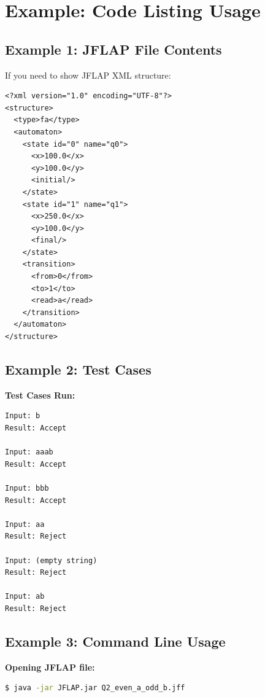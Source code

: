 \documentclass[12pt]{article}
\begin{document}

\section{Example: Code Listing Usage}

\subsection{Example 1: JFLAP File Contents}
If you need to show JFLAP XML structure:

\begin{lstlisting}
<?xml version="1.0" encoding="UTF-8"?>
<structure>
  <type>fa</type>
  <automaton>
    <state id="0" name="q0">
      <x>100.0</x>
      <y>100.0</y>
      <initial/>
    </state>
    <state id="1" name="q1">
      <x>250.0</x>
      <y>100.0</y>
      <final/>
    </state>
    <transition>
      <from>0</from>
      <to>1</to>
      <read>a</read>
    </transition>
  </automaton>
</structure>
\end{lstlisting}

\subsection{Example 2: Test Cases}
\textbf{Test Cases Run:}

\begin{lstlisting}
Input: b
Result: Accept

Input: aaab
Result: Accept

Input: bbb
Result: Accept

Input: aa
Result: Reject

Input: (empty string)
Result: Reject

Input: ab
Result: Reject
\end{lstlisting}

\subsection{Example 3: Command Line Usage}
\textbf{Opening JFLAP file:}

\begin{lstlisting}[language=bash]
$ java -jar JFLAP.jar Q2_even_a_odd_b.jff
\end{lstlisting}
\end{document}
